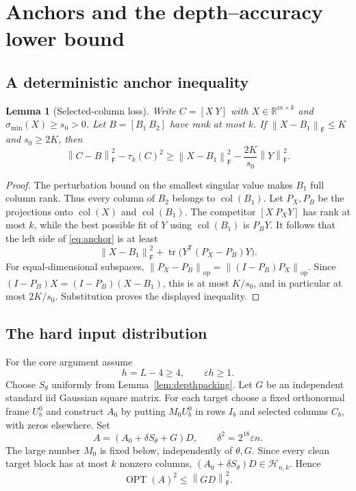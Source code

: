 \documentclass[11pt]{article}
\newtheorem{lemma}[theorem]{Lemma}
\theoremstyle{remark}
\newcommand{\R}{\mathbb R}
\newcommand{\F}{\mathsf F}
\newcommand{\op}{\mathrm{op}}
\newcommand{\Hclass}{\mathcal H_{n,k}}
\newcommand{\OPT}{\operatorname{OPT}}
\newcommand{\tr}{\operatorname{tr}}
\newcommand{\eps}{\varepsilon}
\newcommand{\norm}[1]{\left\lVert #1\right\rVert}
\DeclareMathOperator{\col}{col}
\begin{document}
\section{Anchors and the depth--accuracy lower bound}\label{sec:depthlower}

\subsection{A deterministic anchor inequality}

\begin{lemma}[Selected-column loss]\label{lem:anchor}
Write $C=[X\ Y]$ with $X\in\R^{m\times k}$ and
$\sigma_{\min}(X)\ge s_0>0$. Let $B=[B_1\ B_2]$ have rank at most $k$.
If $\norm{X-B_1}_\F\le K$ and $s_0\ge2K$, then
\begin{equation}\label{eq:anchor}
 \norm{C-B}_\F^2-\tau_k(C)^2
 \ge\norm{X-B_1}_\F^2-\frac{2K}{s_0}\norm Y_\F^2.
\end{equation}
\end{lemma}
\begin{proof}
The perturbation bound on the smallest singular value makes $B_1$ full
column rank. Thus every column of $B_2$ belongs to $\col(B_1)$.
Let $P_X,P_B$ be the projections onto $\col(X)$ and $\col(B_1)$.
The competitor $[X\ P_XY]$ has rank at most $k$, while the best possible
fit of $Y$ using $\col(B_1)$ is $P_BY$. It follows that the left side of
\eqref{eq:anchor} is at least
\[
 \norm{X-B_1}_\F^2+\tr\bigl(Y^{\mathsf T}(P_X-P_B)Y\bigr).
\]
For equal-dimensional subspaces,
$\norm{P_X-P_B}_\op=\norm{(I-P_B)P_X}_\op$.
Since $(I-P_B)X=(I-P_B)(X-B_1)$,
this is at most $K/s_0$, and in particular at most $2K/s_0$.
Substitution proves the displayed inequality.
\end{proof}

\subsection{The hard input distribution}

For the core argument assume
\begin{equation}\label{eq:depthcore}
 h=L-4\ge4,\qquad \eps h\ge1.
\end{equation}
Choose $S_\theta$ uniformly from Lemma~\ref{lem:depthpacking}.
Let $G$ be an independent standard iid Gaussian square matrix.
For each target choose a fixed orthonormal frame $U_b^0$ and construct $A_0$
by putting $M_0U_b^0$ in rows $I_b$ and selected columns $C_b$, with zeros
elsewhere. Set
\begin{equation}\label{eq:depthinput}
 A=(A_0+\delta S_\theta+G)D,
 \qquad \delta^2=2^{18}\eps n.
\end{equation}
The large number $M_0$ is fixed below, independently of $\theta,G$.
Since every clean target block has at most $k$ nonzero columns,
$(A_0+\delta S_\theta)D\in\Hclass$. Hence
\begin{equation}\label{eq:depthopt}
 \OPT(A)^2\le\norm{GD}_\F^2.
\end{equation}
\end{document}
